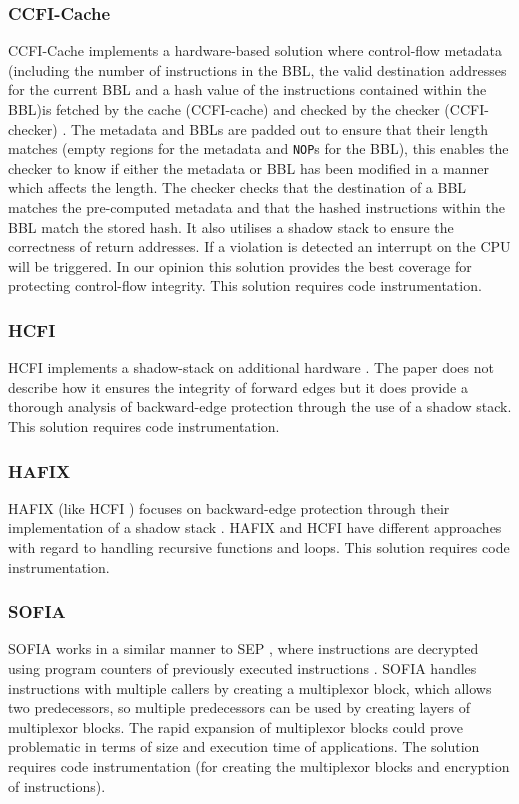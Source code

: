 \subsubsection*{CCFI-Cache}
CCFI-Cache implements a hardware-based solution where control-flow metadata (including the number of instructions in the BBL, the valid destination addresses for the current BBL and a hash value of the instructions contained within the BBL)is fetched by the cache (CCFI-cache) and checked by the checker (CCFI-checker) \cite{Danger2018}. The metadata and BBLs are padded out to ensure that their length matches (empty regions for the metadata and \verb|NOP|s for the BBL), this enables the checker to know if either the metadata or BBL has been modified in a manner which affects the length. The checker checks that the destination of a BBL matches the pre-computed metadata and that the hashed instructions within the BBL match the stored hash. It also utilises a shadow stack to ensure the correctness of return addresses. If a violation is detected an interrupt on the CPU will be triggered. In our opinion this solution provides the best coverage for protecting control-flow integrity. This solution requires code instrumentation.

\subsubsection*{HCFI}
HCFI implements a shadow-stack on additional hardware \cite{Danger2018}. The paper does not describe how it ensures the integrity of forward edges but it does provide a thorough analysis of backward-edge protection through the use of a shadow stack. This solution requires code instrumentation.

\subsubsection*{HAFIX}
HAFIX (like HCFI \cite{Danger2018}) focuses on backward-edge protection through their implementation of a shadow stack \cite{Davi2015}. HAFIX and HCFI have different approaches with regard to handling recursive functions and loops. This solution requires code instrumentation.

\subsubsection*{SOFIA}
SOFIA works in a similar manner to SEP \cite{Lee2019}, where instructions are decrypted using program counters of previously executed instructions \cite{Davi2015}. SOFIA handles instructions with multiple callers by creating a multiplexor block, which allows two predecessors, so multiple predecessors can  be used by creating layers of multiplexor blocks. The rapid expansion of multiplexor blocks could prove problematic in terms of size and execution time of applications. The solution requires code instrumentation (for creating the multiplexor blocks and encryption of instructions).

